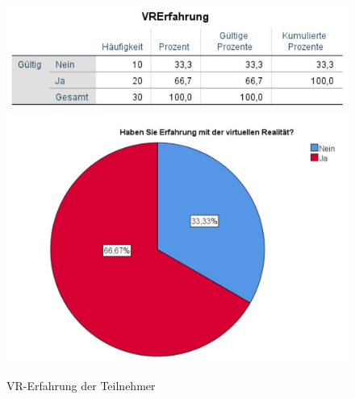 \documentclass[a4paper,11pt]{article}%
\renewcommand{\\}{\vspace*{0.5\baselineskip} \newline}
\begin{document}
	\begin{figure}[H]
		\begin{footnotesize}
			\includegraphics[width=\textwidth]{Abbildungen/Pre_QuestionnaireStatistiks/teilnehmerVRErfahrung}\\
			\includegraphics[width=\textwidth]{Abbildungen/Demographie/teilnehmerVRErfahrung}\\
			\caption{VR-Erfahrung der Teilnehmer}
			\label{fig:teilnehmerVRErfahrung}
		\end{footnotesize}
	\end{figure}	
	
\end{document}
